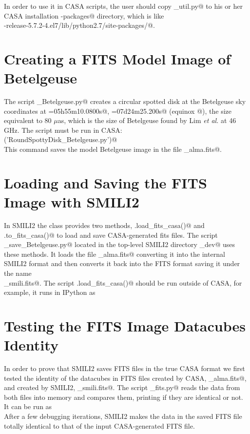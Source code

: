 \documentclass[preprint]{aastex}
\begin{document}
In order to use it in CASA scripts, the user should copy \verb@alma_util.py@ to his or her CASA installation \verb@site-packages@ directory, which is like \\
\verb@casa-release-5.7.2-4.el7/lib/python2.7/site-packages/@.


\section{Creating a FITS Model Image of Betelgeuse}

The script \verb@RoundSpottyDisk_Betelgeuse.py@ creates a circular spotted disk at the Betelgeuse sky coordinates at  \verb@RA=05h55m10.0800s@, \verb@DEC=07d24m25.200s@ (equinox @), the size equivalent to 80 $\mu$as, which is the size of Betelgeuse found by Lim \emph{et al.} at 46 GHz. The script must be run in CASA: \\
\verb@execfile('RoundSpottyDisk_Betelgeuse.py')@ \\
This command saves the model Betelgeuse image in the file \verb@RoundSpottyDisk_alma.fits@.


\section{Loading and Saving the FITS Image with SMILI2}

In SMILI2 the class \verb@imdata@ provides two methods, \verb@imdata.load_fits_casa()@ and \\ \verb@imdata.to_fits_casa()@ to load and save CASA-generated fits files. The script \\
\verb@load_save_Betelgeuse.py@ located in the top-level SMILI2 directory _dev@ uses these methods. It loads the file \verb@RoundSpottyDisk_alma.fits@ converting it into the internal SMILI2 format and then converts it back into the FITS format saving it under the name \\
\verb@RoundSpottyDisk_smili.fits@. The script \verb@imdata.load_fits_casa()@ should be run outside of CASA, for example, it runs in IPython as \\
\verb@%run load_save_Betelgeuse.py @


\section{Testing the FITS Image Datacubes Identity}

In order to prove that SMILI2 saves FITS files in the true CASA format we first tested the identity of the datacubes in FITS files created by CASA, \verb@RoundSpottyDisk_alma.fits@, and created by SMILI2, \verb@RoundSpottyDisk_smili.fits@. The script \verb@diff_fits.py@ reads the data from both files into memory and compares them, printing if they are identical or not. It can be run as \\ 
\verb@%run diff_fits.py@ \\
After a few debugging iterations, SMILI2 makes the data in the saved FITS file totally identical to that of the input CASA-generated FITS file.
\end{document}
